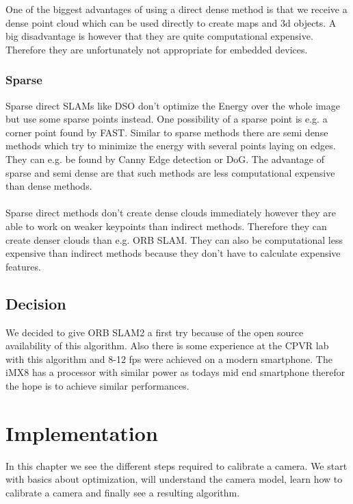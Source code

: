 \documentclass[11pt,a4paper,titlepage,oneside]{report}
\begin{document}
One of the biggest advantages of using a direct dense method is that we receive a dense point cloud which can be used directly to create maps and 3d objects. A big disadvantage is however that they are quite computational expensive. Therefore they are unfortunately not appropriate for embedded devices.

\subsection{Sparse}

Sparse direct SLAMs like DSO don't optimize the Energy over the whole image but use some sparse points instead. One possibility of a sparse point is e.g. a corner point found by FAST. Similar to sparse methods there are semi dense methods which try to minimize the energy with several points laying on edges. They can e.g. be found by Canny Edge detection or DoG. The advantage of sparse and semi dense are that such methods are less computational expensive than dense methods.\\\\

Sparse direct methods don't create dense clouds immediately however they are able to work on weaker keypoints than indirect methods. Therefore they can create denser clouds than e.g. ORB SLAM. They can also be computational less expensive than indirect methods because they don't have to calculate expensive features.

\section{Decision}

We decided to give ORB SLAM2 a first try because of the open source availability of this algorithm. Also there is some experience at the CPVR lab with this algorithm and 8-12 fps were achieved on a modern smartphone. The iMX8 has a processor with similar power as todays mid end smartphone therefor the hope is to achieve similar performances.

\chapter{Implementation}\label{chap:implementation}

In this chapter we see the different steps required to calibrate a camera. We start with basics about optimization, will understand the camera model, learn how to calibrate a camera and finally see a resulting algorithm.
\end{document}

